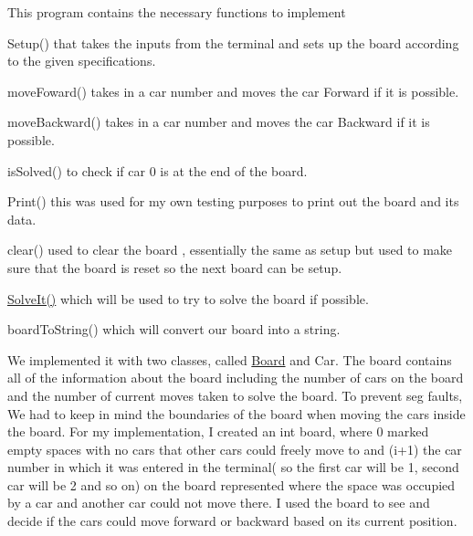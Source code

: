 This program contains the necessary functions to implement
\begin{DoxyItemize}
\item Setup() that takes the inputs from the terminal and sets up the board according to the given specifications.
\item move\+Foward() takes in a car number and moves the car Forward if it is possible.
\item move\+Backward() takes in a car number and moves the car Backward if it is possible.
\item is\+Solved() to check if car 0 is at the end of the board.
\item Print() this was used for my own testing purposes to print out the board and its data.
\item clear() used to clear the board , essentially the same as setup but used to make sure that the board is reset so the next board can be setup.
\item \hyperlink{_rush_hour_8cpp_a03450682e7fd05eadf4f39c3a2b105ad}{Solve\+It()} which will be used to try to solve the board if possible.
\item board\+To\+String() which will convert our board into a string.
\end{DoxyItemize}

We implemented it with two classes, called \hyperlink{class_board}{Board} and Car. The board contains all of the information about the board including the number of cars on the board and the number of current moves taken to solve the board. To prevent seg faults, We had to keep in mind the boundaries of the board when moving the cars inside the board. For my implementation, I created an int board, where 0 marked empty spaces with no cars that other cars could freely move to and (i+1) the car number in which it was entered in the terminal( so the first car will be 1, second car will be 2 and so on) on the board represented where the space was occupied by a car and another car could not move there. I used the board to see and decide if the cars could move forward or backward based on its current position. 